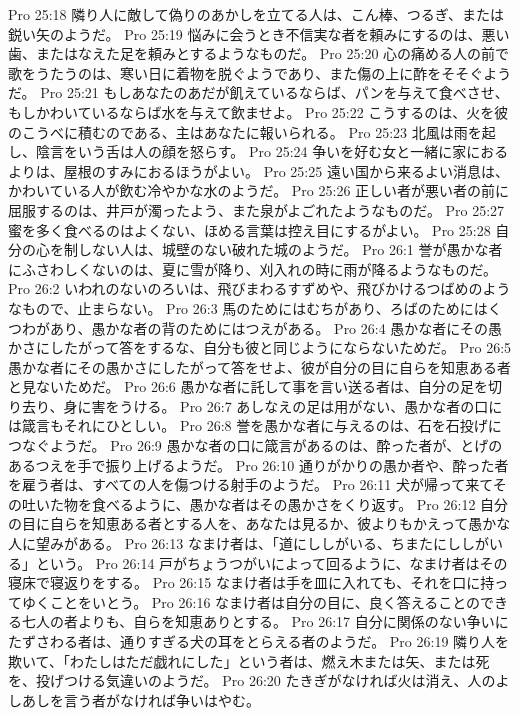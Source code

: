 Pro 25:18  隣り人に敵して偽りのあかしを立てる人は、こん棒、つるぎ、または鋭い矢のようだ。
Pro 25:19  悩みに会うとき不信実な者を頼みにするのは、悪い歯、またはなえた足を頼みとするようなものだ。
Pro 25:20  心の痛める人の前で歌をうたうのは、寒い日に着物を脱ぐようであり、また傷の上に酢をそそぐようだ。
Pro 25:21  もしあなたのあだが飢えているならば、パンを与えて食べさせ、もしかわいているならば水を与えて飲ませよ。
Pro 25:22  こうするのは、火を彼のこうべに積むのである、主はあなたに報いられる。
Pro 25:23  北風は雨を起し、陰言をいう舌は人の顔を怒らす。
Pro 25:24  争いを好む女と一緒に家におるよりは、屋根のすみにおるほうがよい。
Pro 25:25  遠い国から来るよい消息は、かわいている人が飲む冷やかな水のようだ。
Pro 25:26  正しい者が悪い者の前に屈服するのは、井戸が濁ったよう、また泉がよごれたようなものだ。
Pro 25:27  蜜を多く食べるのはよくない、ほめる言葉は控え目にするがよい。
Pro 25:28  自分の心を制しない人は、城壁のない破れた城のようだ。
Pro 26:1  誉が愚かな者にふさわしくないのは、夏に雪が降り、刈入れの時に雨が降るようなものだ。
Pro 26:2  いわれのないのろいは、飛びまわるすずめや、飛びかけるつばめのようなもので、止まらない。
Pro 26:3  馬のためにはむちがあり、ろばのためにはくつわがあり、愚かな者の背のためにはつえがある。
Pro 26:4  愚かな者にその愚かさにしたがって答をするな、自分も彼と同じようにならないためだ。
Pro 26:5  愚かな者にその愚かさにしたがって答をせよ、彼が自分の目に自らを知恵ある者と見ないためだ。
Pro 26:6  愚かな者に託して事を言い送る者は、自分の足を切り去り、身に害をうける。
Pro 26:7  あしなえの足は用がない、愚かな者の口には箴言もそれにひとしい。
Pro 26:8  誉を愚かな者に与えるのは、石を石投げにつなぐようだ。
Pro 26:9  愚かな者の口に箴言があるのは、酔った者が、とげのあるつえを手で振り上げるようだ。
Pro 26:10  通りがかりの愚か者や、酔った者を雇う者は、すべての人を傷つける射手のようだ。
Pro 26:11  犬が帰って来てその吐いた物を食べるように、愚かな者はその愚かさをくり返す。
Pro 26:12  自分の目に自らを知恵ある者とする人を、あなたは見るか、彼よりもかえって愚かな人に望みがある。
Pro 26:13  なまけ者は、「道にししがいる、ちまたにししがいる」という。
Pro 26:14  戸がちょうつがいによって回るように、なまけ者はその寝床で寝返りをする。
Pro 26:15  なまけ者は手を皿に入れても、それを口に持ってゆくことをいとう。
Pro 26:16  なまけ者は自分の目に、良く答えることのできる七人の者よりも、自らを知恵ありとする。
Pro 26:17  自分に関係のない争いにたずさわる者は、通りすぎる犬の耳をとらえる者のようだ。
Pro 26:19  隣り人を欺いて、「わたしはただ戯れにした」という者は、燃え木または矢、または死を、投げつける気違いのようだ。
Pro 26:20  たきぎがなければ火は消え、人のよしあしを言う者がなければ争いはやむ。
